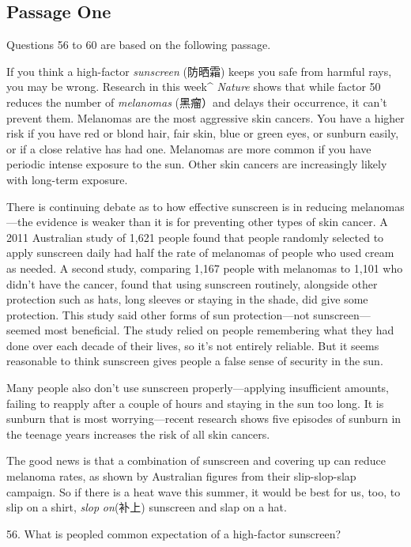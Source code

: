 \documentclass[UTF8,11pt]{ctexart}
\begin{document}
\subsection*{\textbf{Passage One}}


Questions 56 to 60 are based on the following passage.


If you think a high-factor\textit{ sunscreen} (防晒霜) keeps you safe from harmful rays, you may be wrong. Research in this week\textasciicircum{} \textit{Nature} shows that while factor 50 reduces the number of\textit{ melanomas} (黑瘤）and delays their occurrence, it can’t prevent them. Melanomas are the most aggressive skin cancers. You have a higher risk if you have red or blond hair, fair skin, blue or green eyes, or sunburn easily, or if a close relative has had one. Melanomas are more common if you have periodic intense exposure to the sun. Other skin cancers are increasingly likely with long-term exposure.


There is continuing debate as to how effective sunscreen is in reducing melanomas—the evidence is weaker than it is for preventing other types of skin cancer. A 2011 Australian study of 1,621 people found that people randomly selected to apply sunscreen daily had half the rate of melanomas of people who used cream as needed. A second study, comparing 1,167 people with melanomas to 1,101 who didn’t have the cancer, found that using sunscreen routinely, alongside other protection such as hats, long sleeves or staying in the shade, did give some protection. This study said other forms of sun protection—not sunscreen—seemed most beneficial. The study relied on people remembering what they had done over each decade of their lives, so it’s not entirely reliable. But it seems reasonable to think sunscreen gives people a false sense of security in the sun.


Many people also don’t use sunscreen properly—applying insufficient amounts, failing to reapply after a couple of hours and staying in the sun too long. It is sunburn that is most worrying—recent research shows five episodes of sunburn in the teenage years increases the risk of all skin cancers.


The good news is that a combination of sunscreen and covering up can reduce melanoma rates, as shown by Australian figures from their slip-slop-slap campaign. So if there is a heat wave this summer, it would be best for us, too, to slip on a shirt, \textit{slop} \textit{on}(补上) sunscreen and slap on a hat.


56. What is peopled common expectation of a high-factor sunscreen?
\end{document}
